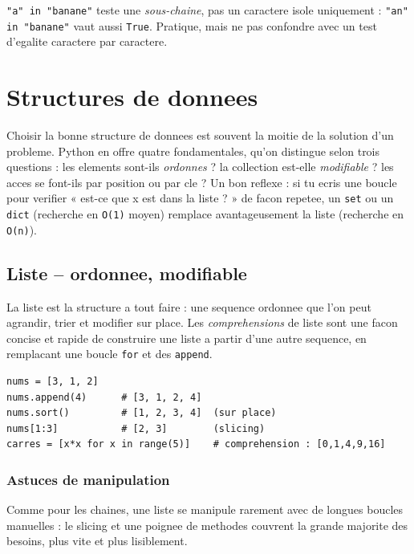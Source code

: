 \documentclass[11pt,a4paper]{article}
\begin{document}
\begin{piege}
\texttt{"a" in "banane"} teste une \emph{sous-chaine}, pas un caractere isole
uniquement : \texttt{"an" in "banane"} vaut aussi \texttt{True}. Pratique, mais
ne pas confondre avec un test d'egalite caractere par caractere.
\end{piege}

\section{Structures de donnees}
Choisir la bonne structure de donnees est souvent la moitie de la solution d'un
probleme. Python en offre quatre fondamentales, qu'on distingue selon trois
questions : les elements sont-ils \emph{ordonnes} ? la collection est-elle
\emph{modifiable} ? les acces se font-ils par position ou par cle ? Un bon
reflexe : si tu ecris une boucle pour verifier « est-ce que x est dans la
liste ? » de facon repetee, un \texttt{set} ou un \texttt{dict} (recherche en
\texttt{O(1)} moyen) remplace avantageusement la liste (recherche en
\texttt{O(n)}).

\subsection{Liste -- ordonnee, modifiable}
La liste est la structure a tout faire : une sequence ordonnee que l'on peut
agrandir, trier et modifier sur place. Les \emph{comprehensions} de liste sont
une facon concise et rapide de construire une liste a partir d'une autre
sequence, en remplacant une boucle \texttt{for} et des \texttt{append}.
\begin{lstlisting}
nums = [3, 1, 2]
nums.append(4)      # [3, 1, 2, 4]
nums.sort()         # [1, 2, 3, 4]  (sur place)
nums[1:3]           # [2, 3]        (slicing)
carres = [x*x for x in range(5)]    # comprehension : [0,1,4,9,16]
\end{lstlisting}

\subsubsection*{Astuces de manipulation}
Comme pour les chaines, une liste se manipule rarement avec de longues boucles
manuelles : le slicing et une poignee de methodes couvrent la grande majorite
des besoins, plus vite et plus lisiblement.
\end{document}
